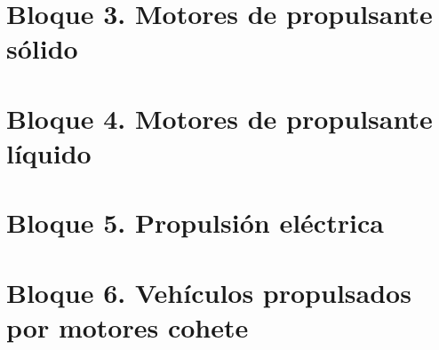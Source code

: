 \part{Bloque 3. Motores de propulsante sólido}




\part{Bloque 4. Motores de propulsante líquido}







\part{Bloque 5. Propulsión eléctrica}




\part{Bloque 6. Vehículos propulsados por motores cohete}





